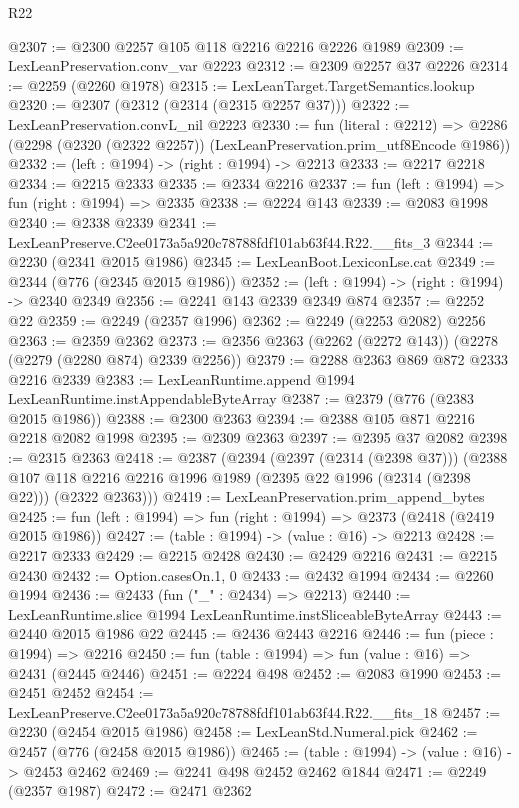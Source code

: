 \begin{lexlean}{R22}
\begin{coremodule}
@2307 := @2300 @2257 @105 @118 @2216 @2216 @2226 @1989
@2309 := LexLeanPreservation.conv_var @2223
@2312 := @2309 @2257 @37 @2226
@2314 := @2259 (@2260 @1978)
@2315 := LexLeanTarget.TargetSemantics.lookup
@2320 := @2307 (@2312 (@2314 (@2315 @2257 @37)))
@2322 := LexLeanPreservation.convL_nil @2223
@2330 := fun (literal : @2212) =>
  @2286 (@2298 (@2320 (@2322 @2257)) (LexLeanPreservation.prim_utf8Encode @1986))
@2332 := (left : @1994) -> (right : @1994) -> @2213
@2333 := @2217 @2218
@2334 := @2215 @2333
@2335 := @2334 @2216
@2337 := fun (left : @1994) => fun (right : @1994) => @2335
@2338 := @2224 @143
@2339 := @2083 @1998
@2340 := @2338 @2339
@2341 := LexLeanPreserve.C2ee0173a5a920c78788fdf101ab63f44.R22.__fits_3
@2344 := @2230 (@2341 @2015 @1986)
@2345 := LexLeanBoot.LexiconLse.cat
@2349 := @2344 (@776 (@2345 @2015 @1986))
@2352 := (left : @1994) -> (right : @1994) -> @2340 @2349
@2356 := @2241 @143 @2339 @2349 @874
@2357 := @2252 @22
@2359 := @2249 (@2357 @1996)
@2362 := @2249 (@2253 @2082) @2256
@2363 := @2359 @2362
@2373 := @2356 @2363 (@2262 (@2272 @143)) (@2278 (@2279 (@2280 @874) @2339 @2256))
@2379 := @2288 @2363 @869 @872 @2333 @2216 @2339
@2383 := LexLeanRuntime.append @1994 LexLeanRuntime.instAppendableByteArray
@2387 := @2379 (@776 (@2383 @2015 @1986))
@2388 := @2300 @2363
@2394 := @2388 @105 @871 @2216 @2218 @2082 @1998
@2395 := @2309 @2363
@2397 := @2395 @37 @2082
@2398 := @2315 @2363
@2418 := @2387
    (@2394
      (@2397 (@2314 (@2398 @37)))
      (@2388 @107 @118 @2216 @2216 @1996 @1989 (@2395 @22 @1996 (@2314 (@2398 @22))) (@2322 @2363)))
@2419 := LexLeanPreservation.prim_append_bytes
@2425 := fun (left : @1994) => fun (right : @1994) => @2373 (@2418 (@2419 @2015 @1986))
@2427 := (table : @1994) -> (value : @16) -> @2213
@2428 := @2217 @2333
@2429 := @2215 @2428
@2430 := @2429 @2216
@2431 := @2215 @2430
@2432 := Option.casesOn.{1, 0}
@2433 := @2432 @1994
@2434 := @2260 @1994
@2436 := @2433 (fun ("_" : @2434) => @2213)
@2440 := LexLeanRuntime.slice @1994 LexLeanRuntime.instSliceableByteArray
@2443 := @2440 @2015 @1986 @22
@2445 := @2436 @2443 @2216
@2446 := fun (piece : @1994) => @2216
@2450 := fun (table : @1994) => fun (value : @16) => @2431 (@2445 @2446)
@2451 := @2224 @498
@2452 := @2083 @1990
@2453 := @2451 @2452
@2454 := LexLeanPreserve.C2ee0173a5a920c78788fdf101ab63f44.R22.__fits_18
@2457 := @2230 (@2454 @2015 @1986)
@2458 := LexLeanStd.Numeral.pick
@2462 := @2457 (@776 (@2458 @2015 @1986))
@2465 := (table : @1994) -> (value : @16) -> @2453 @2462
@2469 := @2241 @498 @2452 @2462 @1844
@2471 := @2249 (@2357 @1987)
@2472 := @2471 @2362

\end{coremodule}
\end{lexlean}
